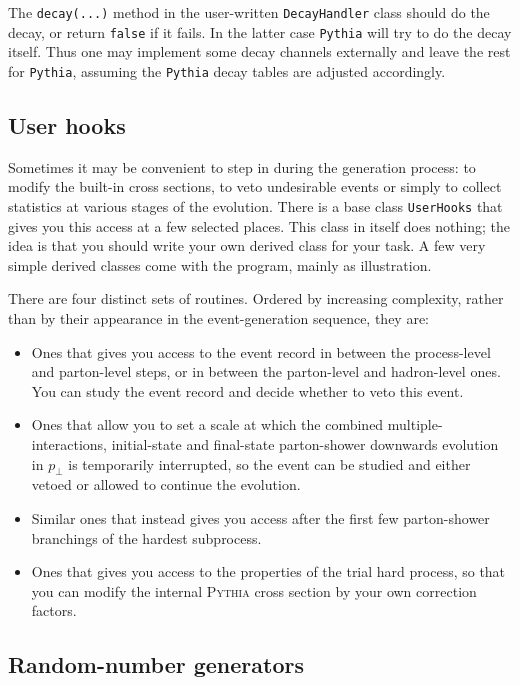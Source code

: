 \documentclass{elsartmod}
\begin{document}
The \texttt{decay(...)} method in the user-written \texttt{DecayHandler}
class should do the decay, or return \texttt{false} if it fails. In the 
latter case \texttt{Pythia} will try to do the decay itself. Thus one 
may implement some decay channels externally and leave the rest for 
\texttt{Pythia}, assuming the \texttt{Pythia} decay tables are adjusted 
accordingly.  

\subsection{User hooks}

Sometimes it may be convenient to step in during the generation process: 
to modify the built-in cross sections, to veto undesirable events or 
simply to collect statistics at various stages of the evolution. There is 
a base class \texttt{UserHooks} that gives you this access at a few 
selected places. This class in itself does nothing; the idea is that you 
should write your own derived class for your task. A few very simple
 derived classes come with the program, mainly as illustration.

There are four distinct sets of routines. Ordered by increasing 
complexity, rather than by their appearance in the event-generation 
sequence, they are:
\begin{itemize}
\item Ones that gives you access to the event record in between the 
process-level and parton-level steps, or in between the parton-level 
and hadron-level ones. You can study the event record and decide whether 
to veto this event.
\item Ones that allow you to set a scale at which the combined 
multiple-interactions, initial-state and final-state parton-shower 
downwards evolution in $p_{\perp}$ is temporarily interrupted, so the 
event can be studied and either vetoed or allowed to continue the 
evolution.
\item Similar ones that instead gives you access after the first few
parton-shower branchings of the hardest subprocess.
\item Ones that gives you access to the properties of the trial 
hard process, so that you can modify the internal \textsc{Pythia} 
cross section by your own correction factors. 
\end{itemize}

\subsection{Random-number generators}
\end{document}
